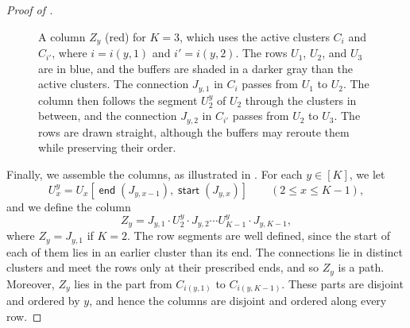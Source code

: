 \documentclass[fontsize=12pt,leading=14pt]{fullpaper}
\DeclareMathOperator{\st}{\mathsf{start}}
\DeclareMathOperator{\en}{\mathsf{end}}
\begin{document}
\begin{proof}[Proof of ]
  \begin{figure}[ht]
    \centering
    \caption{A column $Z_y$ (red) for $K=3$, which uses the active clusters $C_i$ and $C_{i'}$, where $i=i(y,1)$ and $i'=i(y,2)$.
      The rows $U_1$, $U_2$, and $U_3$ are in blue, and the buffers are shaded in a darker gray than the active clusters.
      The connection $J_{y,1}$ in $C_i$ passes from $U_1$ to $U_2$.
      The column then follows the segment $U^y_2$ of $U_2$ through the clusters in between, and the connection $J_{y,2}$ in $C_{i'}$ passes from $U_2$ to $U_3$.
    The rows are drawn straight, although the buffers may reroute them while preserving their order.}
    \label{fig:s3-column}
  \end{figure}

  Finally, we assemble the columns, as illustrated in .
  For each $y\in[K]$, we let
  \[
    U^y_x=U_x[\en(J_{y,x-1}),\st(J_{y,x})]\qquad(2\le x\le K-1),
  \]
  and we define the column
  \[
    Z_y=J_{y,1}\cdot U^y_2\cdot J_{y,2}\cdots U^y_{K-1}\cdot J_{y,K-1},
  \]
  where $Z_y=J_{y,1}$ if $K=2$.
  The row segments are well defined, since the start of each of them lies in an earlier cluster than its end.
  The connections lie in distinct clusters and meet the rows only at their prescribed ends, and so $Z_y$ is a path.
  Moreover, $Z_y$ lies in the part from $C_{i(y,1)}$ to $C_{i(y,K-1)}$.
  These parts are disjoint and ordered by $y$, and hence the columns are disjoint and ordered along every row.


\end{proof}
\end{document}
